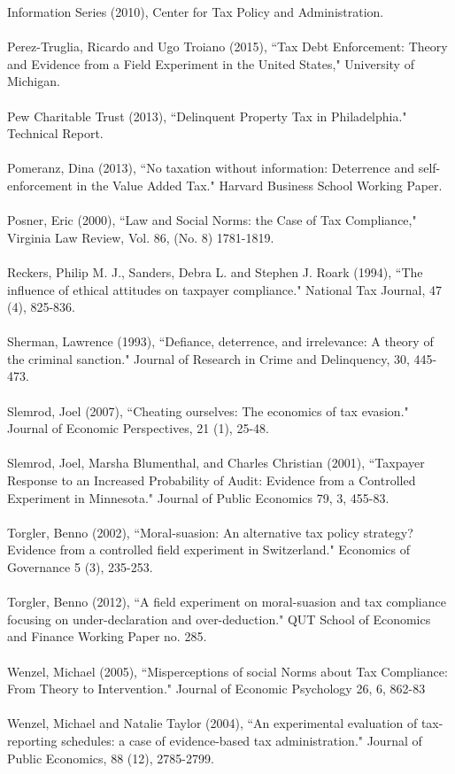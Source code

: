 \documentclass[12pt,titlepage]{article}
\begin{document}
Information Series (2010), Center for Tax Policy and Administration.
\\ 
\\ 
Perez-Truglia, Ricardo and Ugo Troiano (2015), ``Tax Debt Enforcement:
Theory and Evidence from a Field Experiment in the United States,"
University of Michigan.  \\ 
\\ 
Pew Charitable Trust (2013), ``Delinquent Property Tax in
Philadelphia." Technical Report. \\ 
\\ 
Pomeranz, Dina (2013), ``No taxation without information: Deterrence
and self-enforcement in the Value Added Tax."  Harvard Business School
Working Paper. \\ 
\\ 
Posner, Eric (2000), ``Law and Social Norms: the Case of Tax
Compliance," Virginia Law Review, Vol. 86, (No. 8)
1781-1819. \\ 
\\ 
Reckers, Philip M. J., Sanders, Debra L. and Stephen J. Roark (1994),
``The influence of ethical attitudes on taxpayer compliance." National
Tax Journal, 47 (4), 825-836. \\ 
\\ 
Sherman, Lawrence (1993), ``Defiance, deterrence, and irrelevance: A
theory of the criminal sanction."  Journal of Research in Crime and
Delinquency, 30, 445-473. \\ 
\\ 
Slemrod, Joel (2007), ``Cheating ourselves: The economics of tax
evasion." Journal of Economic Perspectives, 21 (1),
25-48. \\ 
\\ 
Slemrod, Joel, Marsha Blumenthal, and Charles Christian (2001),
``Taxpayer Response to an Increased Probability of Audit: Evidence
from a Controlled Experiment in Minnesota." Journal of Public
Economics 79, 3, 455-83.\\ 
\\ 
Torgler, Benno (2002), ``Moral-suasion: An alternative tax policy
strategy?  Evidence from a controlled field experiment in
Switzerland." Economics of Governance 5 (3), 235-253. \\ 
\\ 
Torgler, Benno (2012), ``A field experiment on moral-suasion and tax
compliance focusing on under-declaration and over-deduction." QUT
School of Economics and Finance Working Paper no. 285. \\ 
\\ 
Wenzel, Michael (2005), ``Misperceptions of social Norms about Tax
Compliance: From Theory to Intervention." Journal of Economic
Psychology 26, 6, 862-83\\ 
\\ 
Wenzel, Michael and Natalie Taylor (2004), ``An experimental
evaluation of tax-reporting schedules: a case of evidence-based tax
administration." Journal of Public Economics, 88 (12), 2785-2799.
\end{document}

